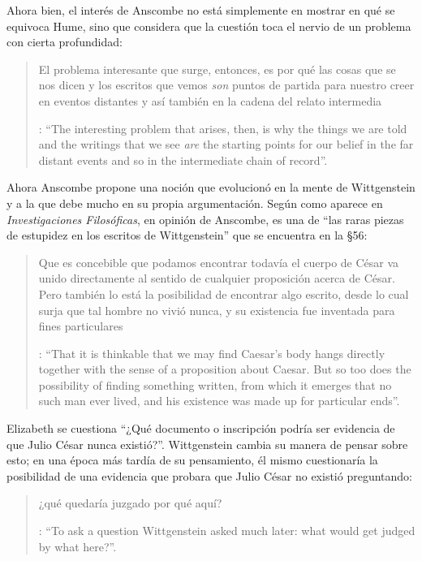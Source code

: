 Ahora bien, el interés de Anscombe no está simplemente en mostrar en qué se equivoca Hume, sino que considera que la cuestión toca el nervio de un problema con cierta profundidad: \blockquote[{\Cite[122]{anscombe2011plato:humecaus}}: \enquote{The interesting problem that arises, then, is why the things we are told and the writings that we see \emph{are} the starting points for our belief in the far distant events and so in the intermediate chain of record}.]{El problema interesante que surge, entonces, es por qué las cosas que se nos dicen y los escritos que vemos \emph{son} puntos de partida para nuestro creer en eventos distantes y así también en la cadena del relato intermedia}.

Ahora Anscombe propone una noción que evolucionó en la mente de Wittgenstein y a la que debe mucho en su propia argumentación. Según como aparece en \emph{Investigaciones Filosóficas}, en opinión de Anscombe, es una de \enquote{las raras piezas de estupidez en los escritos de Wittgenstein} que se encuentra en la \S56: \blockquote[{\Cite[89]{anscombe1981parmenides:humeandjulius}}: \enquote{That it is thinkable that we may find Caesar's body hangs directly together with the sense of a proposition about Caesar. But so too does the possibility of finding something written, from which it emerges that no such man ever lived, and his existence was made up for particular ends}.]{Que es concebible que podamos encontrar todavía el cuerpo de César va unido directamente al sentido de cualquier proposición acerca de César. Pero también lo está la posibilidad de encontrar algo escrito, desde lo cual surja que tal hombre no vivió nunca, y su existencia fue inventada para fines particulares}. Elizabeth se cuestiona \enquote{¿Qué documento o inscripción podría ser evidencia de que Julio César nunca existió?}. Wittgenstein cambia su manera de pensar sobre esto; en una época más tardía de su pensamiento, él mismo cuestionaría la posibilidad de una evidencia que probara que Julio César no existió preguntando: \blockquote[{\Cite[Cf.][89]{anscombe1981parmenides:humeandjulius}}: \enquote{To ask a question Wittgenstein asked much later: what would get judged by what here?}.]{¿qué quedaría juzgado por qué aquí?}.

